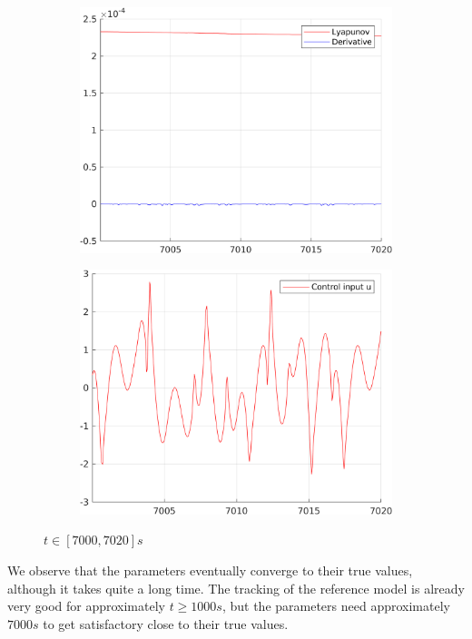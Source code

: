 \documentclass[12pt,a4paper]{article}
\begin{document}
\begin{figure}[H]
\begin{subfigure}{.45\textwidth}
			\includegraphics[width=1\textwidth]{Graphics/NonLinearLyapunov4.png}
		\end{subfigure}%
		\begin{subfigure}{.45\textwidth}
			\centering
			\includegraphics[width=1\textwidth]{Graphics/NonLinearControl4.png}
		\end{subfigure}
		\caption{$t \in [7000,7020]s$}
	\end{figure}
	
	We observe that the parameters eventually converge to their true values, although it takes quite a long time. 
	The tracking of the reference model is already very good for approximately $t \geq 1000s$, but the parameters need approximately $7000s$ to get satisfactory close to their true values.
	
\end{document}
